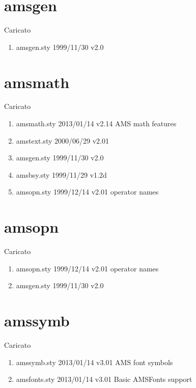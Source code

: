 \section{amsgen}

Caricato 
\begin{enumerate}
\item amsgen.sty 1999/11/30 v2.0
\end{enumerate}
\section{amsmath}

Caricato 
\begin{enumerate}
\item amsmath.sty 2013/01/14 v2.14 AMS math features
\item amstext.sty 2000/06/29 v2.01
\item amsgen.sty 1999/11/30 v2.0
\item amsbsy.sty 1999/11/29 v1.2d
\item amsopn.sty 1999/12/14 v2.01 operator names
\end{enumerate}
\section{amsopn}

Caricato 
\begin{enumerate}
\item amsopn.sty 1999/12/14 v2.01 operator names
\item amsgen.sty 1999/11/30 v2.0
\end{enumerate}
\section{amssymb}

Caricato 
\begin{enumerate}
\item amssymb.sty 2013/01/14 v3.01 AMS font symbols
\item amsfonts.sty 2013/01/14 v3.01 Basic AMSFonts support
\end{enumerate}
